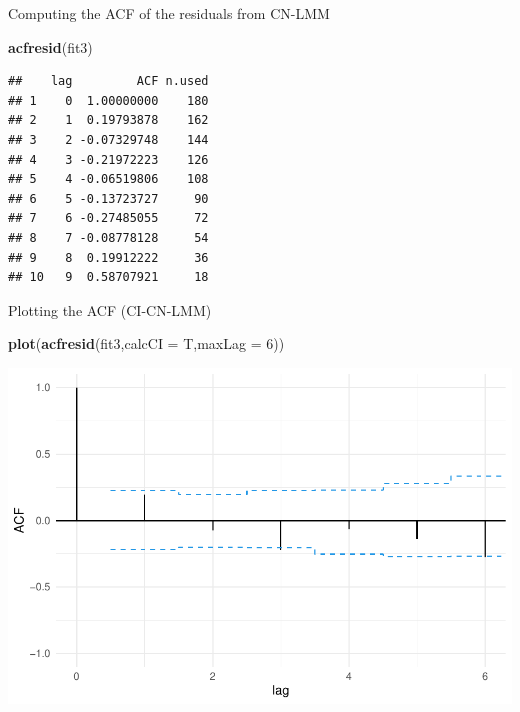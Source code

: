 \documentclass[
  ignorenonframetext,
]{beamer}
\newenvironment{Shaded}{\begin{snugshade}}{\end{snugshade}}
\newcommand{\DataTypeTok}[1]{\textcolor[rgb]{0.13,0.29,0.53}{#1}}
\newcommand{\DecValTok}[1]{\textcolor[rgb]{0.00,0.00,0.81}{#1}}
\newcommand{\KeywordTok}[1]{\textcolor[rgb]{0.13,0.29,0.53}{\textbf{#1}}}
\newcommand{\NormalTok}[1]{#1}
\begin{document}
\begin{frame}[fragile]{Computing the ACF of the residuals from CN-LMM}
\protect\hypertarget{computing-the-acf-of-the-residuals-from-cn-lmm}{}

\begin{Shaded}
\begin{Highlighting}[]
\KeywordTok{acfresid}\NormalTok{(fit3)}
\end{Highlighting}
\end{Shaded}

\begin{verbatim}
##    lag         ACF n.used
## 1    0  1.00000000    180
## 2    1  0.19793878    162
## 3    2 -0.07329748    144
## 4    3 -0.21972223    126
## 5    4 -0.06519806    108
## 6    5 -0.13723727     90
## 7    6 -0.27485055     72
## 8    7 -0.08778128     54
## 9    8  0.19912222     36
## 10   9  0.58707921     18
\end{verbatim}

\end{frame}

\begin{frame}[fragile]{Plotting the ACF (CI-CN-LMM)}
\protect\hypertarget{plotting-the-acf-ci-cn-lmm}{}

\begin{Shaded}
\begin{Highlighting}[]
\KeywordTok{plot}\NormalTok{(}\KeywordTok{acfresid}\NormalTok{(fit3,}\DataTypeTok{calcCI =}\NormalTok{ T,}\DataTypeTok{maxLag =} \DecValTok{6}\NormalTok{))}
\end{Highlighting}
\end{Shaded}

\begin{center}\includegraphics[width=0.85\linewidth]{codes_files/figure-beamer/fit6-1} \end{center}

\end{frame}
\end{document}
